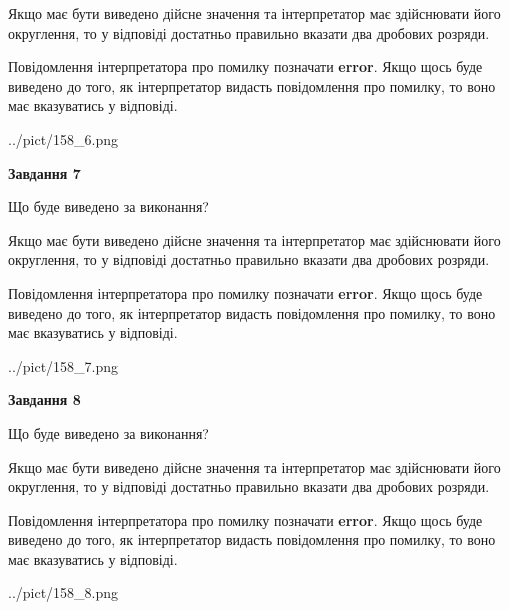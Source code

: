 \documentclass[12pt, ukrainian]{article}
\begin{document}
{\begin {Large}
Якщо має бути виведено дійсне значення та інтерпретатор має здійснювати його округлення, 
то у відповіді достатньо правильно вказати два дробових розряди.

Повідомлення інтерпретатора про помилку позначати \textbf{error}.
Якщо щось буде виведено до того, як інтерпретатор видасть повідомлення про помилку, 
то воно має вказуватись у відповіді. \par

\begin{center}
	{../pict/158_6.png}
\end{center}
\newpage

{\begin {center}\textbf{Завдання 7}\end {center}}\par
Що буде виведено за виконання? \par

Якщо має бути виведено дійсне значення та інтерпретатор має здійснювати його округлення, 
то у відповіді достатньо правильно вказати два дробових розряди.

Повідомлення інтерпретатора про помилку позначати \textbf{error}.
Якщо щось буде виведено до того, як інтерпретатор видасть повідомлення про помилку, 
то воно має вказуватись у відповіді. \par

\begin{center}
	{../pict/158_7.png}
\end{center}
\newpage

{\begin {center}\textbf{Завдання 8}\end {center}}\par
Що буде виведено за виконання? \par

Якщо має бути виведено дійсне значення та інтерпретатор має здійснювати його округлення, 
то у відповіді достатньо правильно вказати два дробових розряди.

Повідомлення інтерпретатора про помилку позначати \textbf{error}.
Якщо щось буде виведено до того, як інтерпретатор видасть повідомлення про помилку, 
то воно має вказуватись у відповіді. \par

\begin{center}
	{../pict/158_8.png}
\end{center}
\newpage


\end{Large}}
\end{document}
